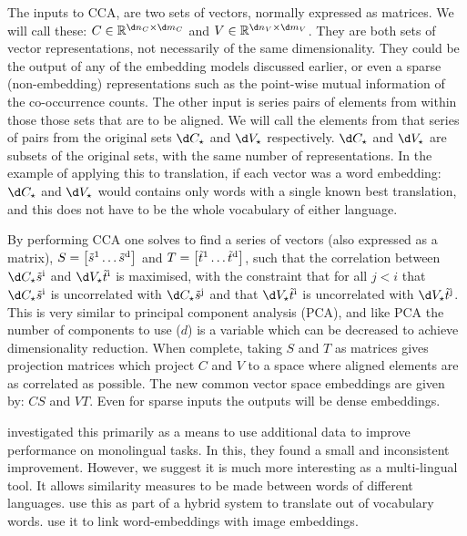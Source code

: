 {The inputs to CCA, are two sets of vectors, normally expressed as matrices.
We will call these:
$C \in \mathbb{R}^{\d n_C \times \d m_C}$ and $V \in \mathbb{R}^{\d n_V \times \d m_V}$.
They are both sets of vector representations, not necessarily of the same dimensionality.
They could be the output of any of the embedding models discussed earlier,
or even a sparse (non-embedding) representations such as the point-wise mutual information of the co-occurrence counts.
The other input is series  pairs of elements from within those those sets that are to be aligned.
We will call the elements from that series of pairs from the original sets $\d C_\star$ and $\d V_\star$ respectively.
$\d C_\star$  and $\d V_\star$ are subsets of the original sets, with the same number of representations.
In the example of applying this to translation, if each vector was a word embedding:
$\d C_\star$  and $\d V_\star$ would contains only words with a single known best translation, and this does not have to be the whole vocabulary of either language.


%
By performing CCA one solves to find a series of vectors (also expressed as a matrix), $S=\left[ \dv s_1 \ldots \dv s_d \right]$ and $T= \left[ \dv t_1 \ldots \dv t_d \right]$,
such that the correlation between $\d C_\star \dv s_i$ and $\d V_\star \dv t_i$ is maximised,
with the constraint that for all $j<i$ that $\d C_\star \dv s_i$ is uncorrelated with $\d C_\star \dv s_j$  and that  $ \d V_\star \dv t_i$ is uncorrelated with $\d V_\star \dv t_j$.
This is very similar to principal component analysis (PCA), and like PCA the number of components to use ($d$) is a variable which can be decreased to achieve dimensionality reduction.
When complete, taking $S$ and $T$ as matrices gives projection matrices which project $C$ and $V$ to a space where aligned elements are as correlated as possible.
The new common vector space embeddings are given by:
$C S$ and $V T$.
Even for sparse inputs the outputs will be dense embeddings.

\textcite{faruqui2014improving} investigated this primarily as a means to use additional data to improve performance on monolingual tasks.
In this, they found a small and inconsistent improvement.
However, we suggest it is much more interesting as a multi-lingual tool.
It allows similarity measures to be made between words of different languages.
 use this as part of a hybrid system to translate out of vocabulary words.
 use it to link word-embeddings with image embeddings.

}
